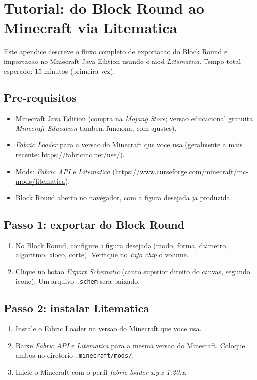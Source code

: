 \documentclass[12pt,a4paper]{scrartcl}
\begin{document}
\newpage
\section{Tutorial: do Block Round ao Minecraft via Litematica}\label{ap:litematica}

Este apendice descreve o fluxo completo de exportacao do Block Round e importacao no Minecraft Java Edition usando o mod \emph{Litematica}. Tempo total esperado: 15 minutos (primeira vez).

\subsection{Pre-requisitos}
\begin{itemize}[leftmargin=1.3em,itemsep=0.1em,topsep=0.2em,nosep]
  \item Minecraft Java Edition (compra na \emph{Mojang Store}; versao educacional gratuita \emph{Minecraft Education} tambem funciona, com ajustes).
  \item \emph{Fabric Loader} para a versao do Minecraft que voce usa (geralmente a mais recente: \url{https://fabricmc.net/use/}).
  \item Mods: \emph{Fabric API} e \emph{Litematica} (\url{https://www.curseforge.com/minecraft/mc-mods/litematica}).
  \item Block Round aberto no navegador, com a figura desejada ja produzida.
\end{itemize}

\subsection{Passo 1: exportar do Block Round}
\begin{enumerate}[leftmargin=1.5em,itemsep=0.15em,topsep=0.3em]
  \item No Block Round, configure a figura desejada (modo, forma, diametro, algoritmo, bloco, corte). Verifique no \emph{Info chip} o volume.
  \item Clique no botao \emph{Export Schematic} (canto superior direito do canvas, segundo icone). Um arquivo \texttt{.schem} sera baixado.
\end{enumerate}

\subsection{Passo 2: instalar Litematica}
\begin{enumerate}[leftmargin=1.5em,itemsep=0.15em,topsep=0.3em]
  \item Instale o Fabric Loader na versao do Minecraft que voce usa.
  \item Baixe \emph{Fabric API} e \emph{Litematica} para a mesma versao do Minecraft. Coloque ambos no diretorio \texttt{.minecraft/mods/}.
  \item Inicie o Minecraft com o perfil \emph{fabric-loader-x.y.z-1.20.x}.
\end{enumerate}
\end{document}
